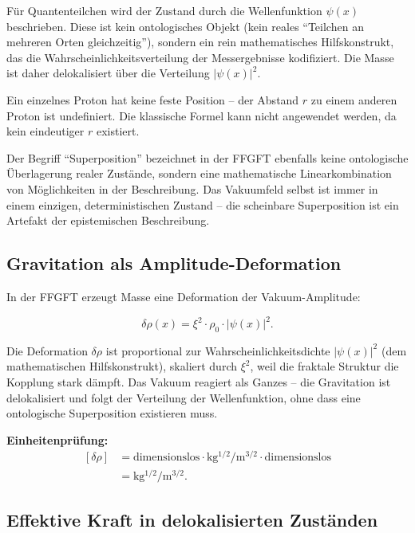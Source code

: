 	Für Quantenteilchen wird der Zustand durch die Wellenfunktion \(\psi(x)\) beschrieben. Diese ist kein ontologisches Objekt (kein reales \enquote{Teilchen an mehreren Orten gleichzeitig}), sondern ein rein mathematisches Hilfskonstrukt, das die Wahrscheinlichkeitsverteilung der Messergebnisse kodifiziert. Die Masse ist daher delokalisiert über die Verteilung \(|\psi(x)|^2\).
	
	Ein einzelnes Proton hat keine feste Position – der Abstand \(r\) zu einem anderen Proton ist undefiniert. Die klassische Formel kann nicht angewendet werden, da kein eindeutiger \(r\) existiert.
	
	Der Begriff \enquote{Superposition} bezeichnet in der FFGFT ebenfalls keine ontologische Überlagerung realer Zustände, sondern eine mathematische Linearkombination von Möglichkeiten in der Beschreibung. Das Vakuumfeld selbst ist immer in einem einzigen, deterministischen Zustand – die scheinbare Superposition ist ein Artefakt der epistemischen Beschreibung.
	
	\subsection*{Gravitation als Amplitude-Deformation}
	
	In der FFGFT erzeugt Masse eine Deformation der Vakuum-Amplitude:
	
	\begin{equation}
		\delta \rho(x) = \xi^2 \cdot \rho_0 \cdot |\psi(x)|^2.
	\end{equation}
	
	Die Deformation \(\delta \rho\) ist proportional zur Wahrscheinlichkeitsdichte \(|\psi(x)|^2\) (dem mathematischen Hilfskonstrukt), skaliert durch \(\xi^2\), weil die fraktale Struktur die Kopplung stark dämpft. Das Vakuum reagiert als Ganzes – die Gravitation ist delokalisiert und folgt der Verteilung der Wellenfunktion, ohne dass eine ontologische Superposition existieren muss.
	
	\textbf{Einheitenprüfung:}
    \[
\begin{aligned}
	[\delta \rho]
	&= \text{dimensionslos}
	\cdot \si{\kilo\gram^{1/2}\per\meter^{3/2}}
	\cdot \text{dimensionslos} \\
	&= \si{\kilo\gram^{1/2}\per\meter^{3/2}}.
\end{aligned}
\]
	
	\subsection*{Effektive Kraft in delokalisierten Zuständen}
	
